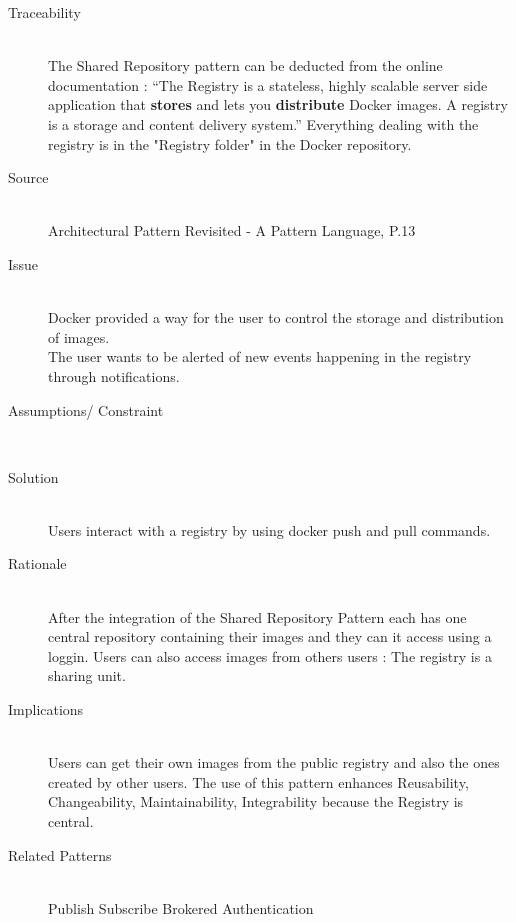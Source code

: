 \begin{description}
\item[Traceability]~\\
The Shared Repository pattern can be deducted from the online documentation : \cite{dockregistry} ``The Registry is a stateless, highly scalable server side application that \textbf{stores} and lets you \textbf{distribute} Docker images. A registry is a storage and content delivery system.''
Everything dealing with the registry is in the "Registry folder" in the Docker repository.


\item[Source]~\\

Architectural Pattern Revisited - A Pattern Language, P.13 \cite{avgeriou2005architectural}

\item[Issue]~\\
Docker provided a way for the user to control the storage and distribution of images. \\
The user wants to be alerted of new events happening in the registry through notifications. %

\item[Assumptions/ Constraint]~\\

\item[Solution]~\\ %
Users interact with a registry by using docker push and pull commands. %

\item[Rationale]~\\ %
 After the integration of the Shared Repository Pattern each has one central repository containing their images and they can it access using a loggin.
 Users can also access images from others users : The registry is a sharing unit. \\
 
 \item [Implications]~\\
Users can get their own images from the public registry and also the ones created by other users. %
The use of this pattern enhances Reusability, Changeability, Maintainability, Integrability because the Registry is central.

\item [Related Patterns]~\\
Publish Subscribe 
Brokered Authentication


\end{description}
